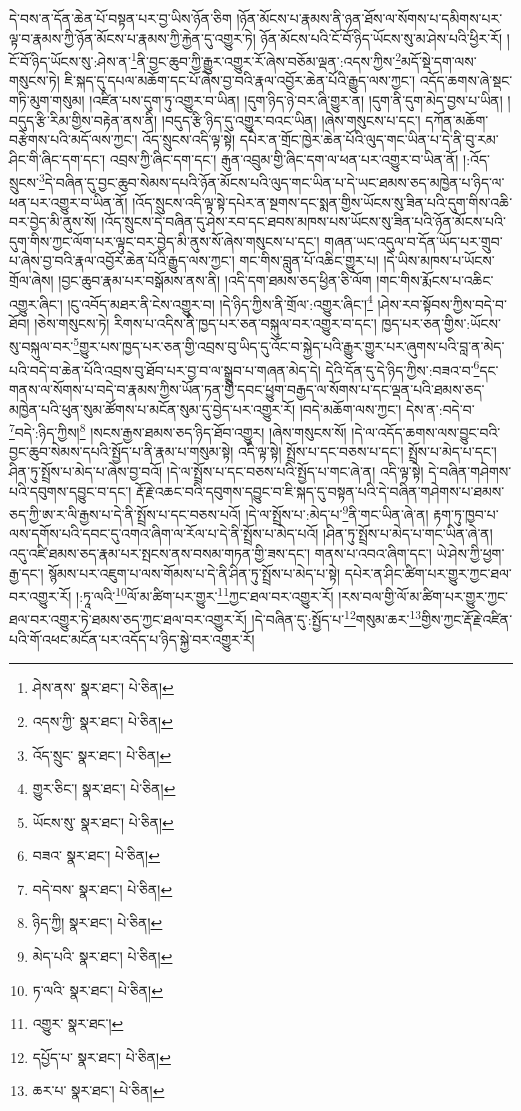 དེ་བས་ན་དོན་ཆེན་པོ་བསྟན་པར་བྱ་ཡིས་ཉོན་ཅིག །ཉོན་མོངས་པ་རྣམས་ནི་ཉན་ཐོས་ལ་སོགས་པ་དམིགས་པར་ལྟ་བ་རྣམས་ཀྱི་ཉོན་མོངས་པ་རྣམས་ཀྱི་རྐྱེན་དུ་འགྱུར་ཏེ། ཉོན་མོངས་པའི་ངོ་བོ་ཉིད་ཡོངས་སུ་མ་ཤེས་པའི་ཕྱིར་རོ། །ངོ་བོ་ཉིད་ཡོངས་སུ་:ཤེས་ན་\footnote{ཤེས་ནས་  སྣར་ཐང་།  པེ་ཅིན། }ནི་བྱང་ཆུབ་ཀྱི་རྒྱུར་འགྱུར་རོ་ཞེས་བཅོམ་ལྡན་:འདས་ཀྱིས་\footnote{འདས་ཀྱི་  སྣར་ཐང་།  པེ་ཅིན། }མདོ་སྡེ་དག་ལས་གསུངས་ཏེ། ཇི་སྐད་དུ་དཔལ་མཆོག་དང་པོ་ཞེས་བྱ་བའི་རྣལ་འབྱོར་ཆེན་པོའི་རྒྱུད་ལས་ཀྱང་། འདོད་ཆགས་ཞེ་སྡང་གཏི་མུག་གསུམ། །འཛིན་པས་དུག་ཏུ་འགྱུར་བ་ཡིན། །དུག་ཉིད་ཉེ་བར་ཞི་གྱུར་ན། །དུག་ནི་དུག་མེད་བྱས་པ་ཡིན། །བདུད་རྩི་རིམ་གྱིས་བརྟེན་ནས་ནི། །བདུད་རྩི་ཉིད་དུ་འགྱུར་བའང་ཡིན། །ཞེས་གསུངས་པ་དང་། དཀོན་མཆོག་བརྩེགས་པའི་མདོ་ལས་ཀྱང་། འོད་སྲུངས་འདི་ལྟ་སྟེ། དཔེར་ན་གྲོང་ཁྱེར་ཆེན་པོའི་ལུད་གང་ཡིན་པ་དེ་ནི་བུ་རམ་ཤིང་གི་ཞིང་དག་དང་། འབྲས་ཀྱི་ཞིང་དག་དང་། རྒུན་འབྲུམ་གྱི་ཞིང་དག་ལ་ཕན་པར་འགྱུར་བ་ཡིན་ནོ། །:འོད་སྲུངས་\footnote{འོད་སྲུང་  སྣར་ཐང་།  པེ་ཅིན། }དེ་བཞིན་དུ་བྱང་ཆུབ་སེམས་དཔའི་ཉོན་མོངས་པའི་ལུད་གང་ཡིན་པ་དེ་ཡང་ཐམས་ཅད་མཁྱེན་པ་ཉིད་ལ་ཕན་པར་འགྱུར་བ་ཡིན་ནོ། །འོད་སྲུངས་འདི་ལྟ་སྟེ་དཔེར་ན་སྔགས་དང་སྨན་གྱིས་ཡོངས་སུ་ཟིན་པའི་དུག་གིས་འཆི་བར་བྱེད་མི་ནུས་སོ། །འོད་སྲུངས་དེ་བཞིན་དུ་ཤེས་རབ་དང་ཐབས་མཁས་པས་ཡོངས་སུ་ཟིན་པའི་ཉོན་མོངས་པའི་དུག་གིས་ཀྱང་ལོག་པར་ལྟུང་བར་བྱེད་མི་ནུས་སོ་ཞེས་གསུངས་པ་དང་། གཞན་ཡང་འདུལ་བ་དོན་ཡོད་པར་གྲུབ་པ་ཞེས་བྱ་བའི་རྣལ་འབྱོར་ཆེན་པོའི་རྒྱུད་ལས་ཀྱང་། གང་གིས་བླུན་པོ་འཆིང་གྱུར་པ། །དེ་ཡིས་མཁས་པ་ཡོངས་གྲོལ་ཞེས། །བྱང་ཆུབ་རྣམ་པར་བསྒོམས་ནས་ནི། །འདི་དག་ཐམས་ཅད་ཕྱིན་ཅི་ལོག །གང་གིས་རྨོངས་པ་འཆིང་འགྱུར་ཞིང་། །ངུ་འབོད་མཐར་ནི་ངེས་འགྱུར་བ། །དེ་ཉིད་ཀྱིས་ནི་གྲོལ་:འགྱུར་ཞིང་།\footnote{གྱུར་ཅིང་།  སྣར་ཐང་།  པེ་ཅིན། } །ཤེས་རབ་སྟོབས་ཀྱིས་བདེ་བ་ཐོབ། །ཅེས་གསུངས་ཏེ། རིགས་པ་འདིས་ནི་ཁྱད་པར་ཅན་བསྐུལ་བར་འགྱུར་བ་དང་། ཁྱད་པར་ཅན་གྱིས་:ཡོངས་སུ་བསྐུལ་བར་\footnote{ཡོངས་སུ་  སྣར་ཐང་།  པེ་ཅིན། }གྱུར་པས་ཁྱད་པར་ཅན་གྱི་འབྲས་བུ་ཡིད་དུ་འོང་བ་སྐྱེད་པའི་རྒྱུར་གྱུར་པར་ཞུགས་པའི་བླ་ན་མེད་པའི་བདེ་བ་ཆེན་པོའི་འབྲས་བུ་ཐོབ་པར་བྱ་བ་ལ་སྒྲུབ་པ་གཞན་མེད་དེ། དེའི་དོན་དུ་དེ་ཉིད་ཀྱིས་:བཟའ་བ་\footnote{བཟའ་  སྣར་ཐང་།  པེ་ཅིན། }དང་གནས་ལ་སོགས་པ་བདེ་བ་རྣམས་ཀྱིས་ཡོན་ཏན་གྱི་དབང་ཕྱུག་བརྒྱད་ལ་སོགས་པ་དང་ལྡན་པའི་ཐམས་ཅད་མཁྱེན་པའི་ཕུན་སུམ་ཚོགས་པ་མངོན་སུམ་དུ་བྱེད་པར་འགྱུར་རོ། །བདེ་མཆོག་ལས་ཀྱང་། དེས་ན་:བདེ་བ་\footnote{བདེ་བས་  སྣར་ཐང་།  པེ་ཅིན། }བདེ་:ཉིད་ཀྱིས།\footnote{ཉིད་ཀྱི།  སྣར་ཐང་།  པེ་ཅིན། } །སངས་རྒྱས་ཐམས་ཅད་ཉིད་ཐོབ་འགྱུར། །ཞེས་གསུངས་སོ། །དེ་ལ་འདོད་ཆགས་ལས་བྱུང་བའི་བྱང་ཆུབ་སེམས་དཔའི་སྤྱོད་པ་ནི་རྣམ་པ་གསུམ་སྟེ། འདི་ལྟ་སྟེ། སྤྲོས་པ་དང་བཅས་པ་དང་། སྤྲོས་པ་མེད་པ་དང་། ཤིན་ཏུ་སྤྲོས་པ་མེད་པ་ཞེས་བྱ་བའོ། །དེ་ལ་སྤྲོས་པ་དང་བཅས་པའི་སྤྱོད་པ་གང་ཞེ་ན། འདི་ལྟ་སྟེ། དེ་བཞིན་གཤེགས་པའི་དབུགས་དབྱུང་བ་དང་། རྡོ་རྗེ་འཆང་བའི་དབུགས་དབྱུང་བ་ཇི་སྐད་དུ་བསྟན་པའི་དེ་བཞིན་གཤེགས་པ་ཐམས་ཅད་ཀྱི་ཨ་ར་ལི་རྒྱས་པ་དེ་ནི་སྤྲོས་པ་དང་བཅས་པའོ། །དེ་ལ་སྤྲོས་པ་:མེད་པ་\footnote{མེད་པའི་  སྣར་ཐང་།  པེ་ཅིན། }ནི་གང་ཡིན་ཞེ་ན། རྟག་ཏུ་ཁྱབ་པ་ལས་དགོས་པའི་དབང་དུ་འགའ་ཞིག་ལ་རོལ་པ་དེ་ནི་སྤྲོས་པ་མེད་པའོ། །ཤིན་ཏུ་སྤྲོས་པ་མེད་པ་གང་ཡིན་ཞེ་ན། འདུ་འཛི་ཐམས་ཅད་རྣམ་པར་སྤངས་ནས་བསམ་གཏན་གྱི་ཟས་དང་། གནས་པ་འབའ་ཞིག་དང་། ཡེ་ཤེས་ཀྱི་ཕྱག་རྒྱ་དང་། སྙོམས་པར་འཇུག་པ་ལས་གོམས་པ་དེ་ནི་ཤིན་ཏུ་སྤྲོས་པ་མེད་པ་སྟེ། དཔེར་ན་ཤིང་ཚིག་པར་གྱུར་ཀྱང་ཐལ་བར་འགྱུར་རོ། །:ཏཱ་ལའི་\footnote{ཏ་ལའི་  སྣར་ཐང་།  པེ་ཅིན། }ལོ་མ་ཚིག་པར་གྱུར་\footnote{འགྱུར་  སྣར་ཐང་། }ཀྱང་ཐལ་བར་འགྱུར་རོ། །རས་བལ་གྱི་ལོ་མ་ཚིག་པར་གྱུར་ཀྱང་ཐལ་བར་འགྱུར་ཏེ་ཐམས་ཅད་ཀྱང་ཐལ་བར་འགྱུར་རོ། །དེ་བཞིན་དུ་:སྤྱོད་པ་\footnote{དཔྱོད་པ་  སྣར་ཐང་།  པེ་ཅིན། }གསུམ་ཆར་\footnote{ཆར་པ་  སྣར་ཐང་།  པེ་ཅིན། }གྱིས་ཀྱང་རྡོ་རྗེ་འཛིན་པའི་གོ་འཕང་མངོན་པར་འདོད་པ་ཉིད་སྐྱེ་བར་འགྱུར་རོ། 